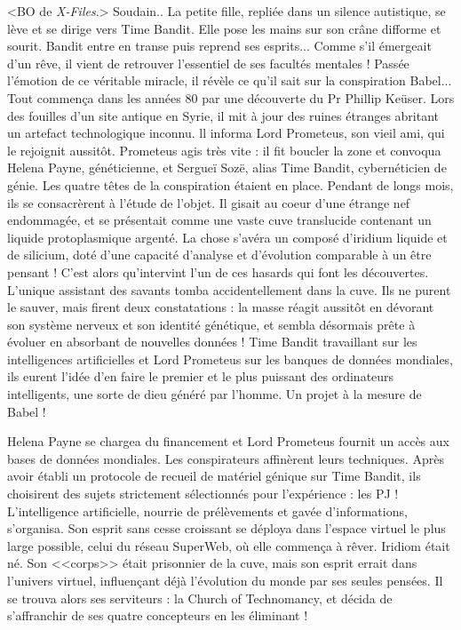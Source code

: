 \documentclass[11pt,twoside,a4paper]{book}
\begin{document}
<BO de \emph{X-Files}.> Soudain.. La petite fille, repli{\'e}e dans un silence autistique, se l{\`e}ve et se dirige vers Time Bandit. Elle pose les mains sur son cr{\^a}ne difforme et sourit. Bandit entre en transe puis reprend ses esprits... Comme s'il {\'e}mergeait d'un r{\^e}ve, il vient de retrouver l'essentiel de ses facult{\'e}s mentales ! Pass{\'e}e l'{\'e}motion de ce v{\'e}ritable miracle, il r{\'e}v{\`e}le ce qu'il sait sur la conspiration Babel... Tout commen\c{c}a dans les ann{\'e}es 80 par une d{\'e}couverte du Pr Phillip Ke{\"u}ser. Lors des fouilles d'un site antique en Syrie, il mit {\`a} jour des ruines {\'e}tranges abritant un artefact technologique inconnu. ll informa Lord Prometeus, son vieil ami, qui le rejoignit aussit{\^o}t. Prometeus agis tr{\`e}s vite : il fit boucler la zone et convoqua Helena Payne, g{\'e}n{\'e}ticienne, et Sergue{\"i} Soz{\"e}, alias Time Bandit, cybern{\'e}ticien de g{\'e}nie. Les quatre t{\^e}tes de la conspiration {\'e}taient en place. Pendant de longs mois, ils se consacr{\`e}rent {\`a} l'{\'e}tude de l'objet. Il gisait au coeur d'une {\'e}trange nef endommag{\'e}e, et se pr{\'e}sentait comme une vaste cuve translucide contenant un liquide protoplasmique argent{\'e}. La chose s'av{\'e}ra un compos{\'e} d'iridium liquide et de silicium, dot{\'e} d'une capacit{\'e} d'analyse et d'{\'e}volution comparable {\`a} un {\^e}tre pensant ! C'est alors qu'intervint l'un de ces hasards qui font les d{\'e}couvertes. L'unique assistant des savants tomba accidentellement dans la cuve. Ils ne purent le sauver, mais firent deux constatations : la masse r{\'e}agit aussit{\^o}t en d{\'e}vorant son syst{\`e}me nerveux et son identit{\'e} g{\'e}n{\'e}tique, et sembla d{\'e}sormais pr{\^e}te {\`a} {\'e}voluer en absorbant de nouvelles donn{\'e}es ! Time Bandit travaillant sur les intelligences artificielles et Lord Prometeus sur les banques de donn{\'e}es mondiales, ils eurent l'id{\'e}e d'en faire le premier et le plus puissant des ordinateurs intelligents, une sorte de dieu g{\'e}n{\'e}r{\'e} par l'homme. Un projet {\`a} la mesure de Babel !~\\

\clearpage

Helena Payne se chargea du financement et Lord Prometeus fournit un acc{\`e}s aux bases de donn{\'e}es mondiales. Les conspirateurs affin{\`e}rent leurs techniques. Apr{\`e}s avoir {\'e}tabli un protocole de recueil de mat{\'e}riel g{\'e}nique sur Time Bandit, ils choisirent des sujets strictement s{\'e}lectionn{\'e}s pour l'exp{\'e}rience : les PJ ! L'intelligence artificielle, nourrie de pr{\'e}l{\`e}vements et gav{\'e}e d'informations, s'organisa. Son esprit sans cesse croissant se d{\'e}ploya dans l'espace virtuel le plus large possible, celui du r{\'e}seau SuperWeb, o{\`u} elle commen\c{c}a {\`a} r{\^e}ver. Iridiom {\'e}tait n{\'e}. Son <<corps>> {\'e}tait prisonnier de la cuve, mais son esprit errait dans l'univers virtuel, influen\c{c}ant d{\'e}j{\`a} l'{\'e}volution du monde par ses seules pens{\'e}es. Il se trouva alors ses serviteurs : la Church of Technomancy, et d{\'e}cida de s'affranchir de ses quatre concepteurs en les {\'e}liminant !~\\
\end{document}
